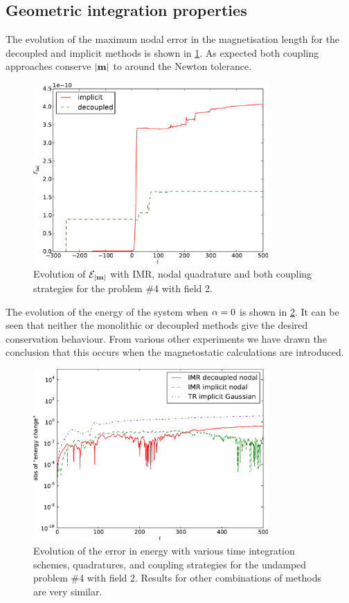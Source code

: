 \subsection{Geometric integration properties}

The evolution of the maximum nodal error in the magnetisation length for the decoupled and implicit methods is shown in \cref{fig:imr-conservation}.
As expected both coupling approaches conserve $\left|{\boldsymbol{\mathrm{m}}} \right|$ to around the Newton tolerance.
\begin{figure}
  \centering
  \includegraphics[width=0.8\textwidth]{plots/mumag4_ml/mlengtherrormaxesvstimes.pdf}
  \caption{
    Evolution of $\mathcal{E}_{\left|{\boldsymbol{\mathrm{m}}} \right|}$
    with IMR, nodal quadrature and both coupling strategies
    for the \mumag problem \#4 with field 2.
  }
  \label{fig:imr-conservation}
\end{figure}


The evolution of the energy of the system when $\alpha = 0$ is shown in \cref{fig:energy-conservation}.
It can be seen that neither the monolithic or decoupled methods give the desired conservation behaviour.
From various other experiments we have drawn the conclusion that this occurs when the magnetostatic calculations are introduced.
\begin{figure}
  \centering
  \includegraphics[width=0.8\textwidth]
  {plots/sq_mumag4_energy_conservation/absofenergychangevstimes.pdf}
  \caption{
    Evolution of the error in energy
    with various time integration schemes, quadratures, and coupling strategies
    for the undamped \mumag problem \#4 with field 2.
    Results for other combinations of methods are very similar.
  }
  \label{fig:energy-conservation}
\end{figure}

